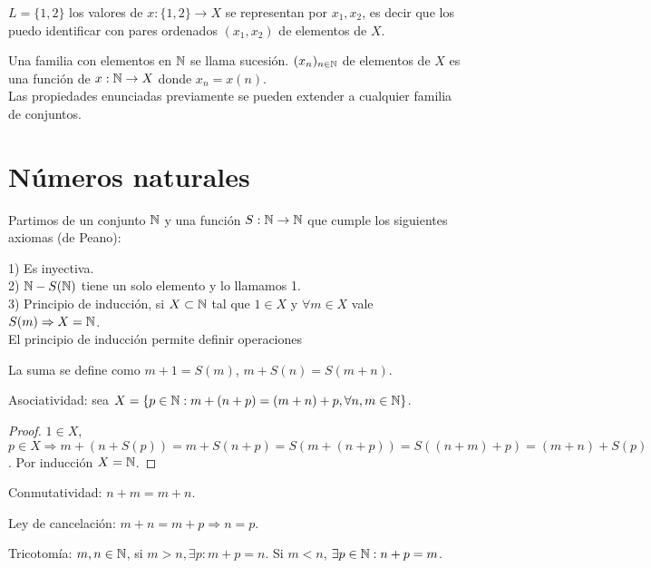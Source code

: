 \begin{eg}
    $L = \{ 1, 2 \}$ los valores de $x: \{1, 2\} \to X$ se representan por $x_1, x_2$, es decir que los puedo identificar con pares ordenados $(x_1, x_2)$ de elementos de $X$.
\end{eg}

Una familia con elementos en $\mathbb{N}$ se llama sucesión. $(x_n)_{n \in \mathbb{N}}$ de elementos de $X$ es una función de $x: \mathbb{N} \to X$ donde $x_n = x(n)$. \\

Las propiedades enunciadas previamente se pueden extender a cualquier familia de conjuntos.

\section{Números naturales}

Partimos de un conjunto $\mathbb{N}$ y una función $S: \mathbb{N} \to \mathbb{N}$ que cumple los siguientes axiomas (de Peano):

1) Es inyectiva. \\
2) $\mathbb{N} - S(\mathbb{N})$ tiene un solo elemento y lo llamamos 1. \\
3) Principio de inducción, si $X \subset \mathbb{N}$ tal que $1 \in X$ y $\forall m \in X$ vale $S(m) \Rightarrow X = \mathbb{N}$. \\

El principio de inducción permite definir operaciones

La suma se define como $m+1 = S(m)$, $m+S(n) = S(m+n)$. 

\begin{prop}
    Asociatividad: sea $X = \{ p \in \mathbb{N} : m+(n+p) = (m+n) +p, \forall n,m \in \mathbb{N} \}$.
    \begin{proof}
        $1 \in X$, $p \in X \Rightarrow m + (n+S(p)) = m + S(n+p) = S(m +(n+p)) = S((n+m)+p) = (m+n) + S(p)$.
        Por inducción $X = \mathbb{N}$.
    \end{proof}
\end{prop}


\begin{prop}
    Conmutatividad: $n+m = m+n$.
\end{prop}

\begin{prop}
    Ley de cancelación: $m+n = m+p \Rightarrow n=p$.
\end{prop}

\begin{prop}
    Tricotomía: $m,n \in \mathbb{N}$, si $m > n, \exists p:m+p=n$. Si $m < n$,  $\exists p \in \mathbb{N} :n+p=m$.
\end{prop}

